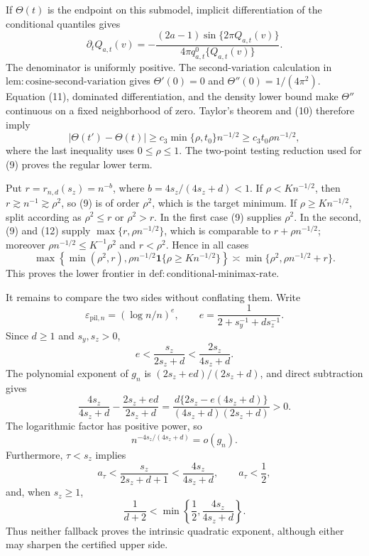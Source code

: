 If \(\Theta(t)\) is the endpoint on this submodel, implicit differentiation of the conditional quantiles gives
\[
\partial_tQ_{a,t}(v)
=-\frac{(2a-1)\sin\{2\pi Q_{a,t}(v)\}}
{4\pi q_{a,t}^{0}\{Q_{a,t}(v)\}}.                                             \tag{11}
\]
The denominator is uniformly positive.  The second-variation calculation in \(\mathrm{lem{:}cosine\text{-}second\text{-}variation}\) gives \(\Theta'(0)=0\) and \(\Theta''(0)=1/(4\pi^2)\).  Equation (11), dominated differentiation, and the density lower bound make \(\Theta''\) continuous on a fixed neighborhood of zero.  Taylor's theorem and (10) therefore imply
\[
|\Theta(t')-\Theta(t)|
\ge c_3\min\{\rho,t_0\}n^{-1/2}
\ge c_3t_0\rho n^{-1/2},                                                       \tag{12}
\]
where the last inequality uses \(0\le\rho\le1\).  The two-point testing reduction used for (9) proves the regular lower term.

Put \(r=r_{n,d}(s_z)=n^{-b}\), where \(b=4s_z/(4s_z+d)<1\).  If \(\rho<K n^{-1/2}\), then \(r\gtrsim n^{-1}\gtrsim\rho^2\), so (9) is of order \(\rho^2\), which is the target minimum.  If \(\rho\ge K n^{-1/2}\), split according as \(\rho^2\le r\) or \(\rho^2>r\).  In the first case (9) supplies \(\rho^2\).  In the second, (9) and (12) supply \(\max\{r,\rho n^{-1/2}\}\), which is comparable to \(r+\rho n^{-1/2}\); moreover \(\rho n^{-1/2}\le K^{-1}\rho^2\) and \(r<\rho^2\).  Hence in all cases
\[
\max\!\left\{\min(\rho^2,r),
\rho n^{-1/2}\mathbf1\{\rho\ge Kn^{-1/2}\}\right\}
\asymp\min\{\rho^2,\rho n^{-1/2}+r\}.                                        \tag{13}
\]
This proves the lower frontier in \(\mathrm{def{:}conditional\text{-}minimax\text{-}rate}\).

It remains to compare the two sides without conflating them.  Write
\[
\varepsilon_{\mathrm{pil},n}=(\log n/n)^e,
\qquad e=\frac1{2+s_y^{-1}+ds_z^{-1}}.
\]
Since \(d\ge1\) and \(s_y,s_z>0\),
\[
e<\frac{s_z}{2s_z+d}<\frac{2s_z}{4s_z+d}.                                      \tag{14}
\]
The polynomial exponent of \(g_n\) is \((2s_z+ed)/(2s_z+d)\), and direct subtraction gives
\[
\frac{4s_z}{4s_z+d}-\frac{2s_z+ed}{2s_z+d}
=\frac{d\{2s_z-e(4s_z+d)\}}{(4s_z+d)(2s_z+d)}>0.                              \tag{15}
\]
The logarithmic factor has positive power, so
\[
n^{-4s_z/(4s_z+d)}=o(g_n).                                                       \tag{16}
\]
Furthermore, \(\tau<s_z\) implies
\[
a_\tau<\frac{s_z}{2s_z+d+1}<\frac{4s_z}{4s_z+d},
\qquad a_\tau<\frac12,                                                         \tag{17}
\]
and, when \(s_z\ge1\),
\[
\frac1{d+2}<\min\!\left\{\frac12,\frac{4s_z}{4s_z+d}\right\}.               \tag{18}
\]
Thus neither fallback proves the intrinsic quadratic exponent, although either may sharpen the certified upper side.

